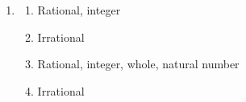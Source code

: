  \begin{solutions}{}{

\begin{enumerate}[itemsep=5pt, label=\textbf{\arabic*}. ] 
 \item \begin{multicols}{2} %
  \begin{enumerate}[noitemsep, label=\textbf{(\alph*)} ] 
    \item Rational, integer%
    \item Irrational%
    \item Rational, integer, whole, natural number%
    \item Irrational %
  \end{enumerate} 



\end{multicols}
\end{enumerate}}
\end{solutions}
